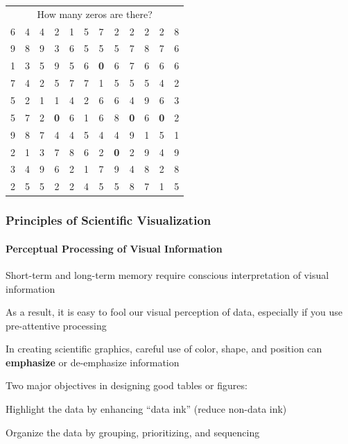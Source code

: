 \documentclass[10pt]{beamer}
\begin{document}
\begin{frame}
{\scriptsize
\begin{center}
\begin{tabular}{cccccccccccc}
\multicolumn{12}{c}{How many zeros are there?}\\
6     & 4    & 4    & 2    & 1    & 5    & 7    & 2    & 2    & 2    & 2    & 8    \\
9     & 8    & 9    & 3    & 6    & 5    & 5    & 5    & 7    & 8    & 7    & 6    \\
1     & 3    & 5    & 9    & 5    & 6    & {\bf \small \color{red}0}    & 6    & 7    & 6    & 6    & 6    \\
7     & 4    & 2    & 5    & 7    & 7    & 1    & 5    & 5    & 5    & 4    & 2   \\
5     & 2    & 1    & 1    & 4    & 2    & 6    & 6    & 4    & 9    & 6    & 3    \\
5     & 7    & 2    & {\bf \small \color{red}0}    & 6    & 1    & 6    & 8    & {\bf
  \small \color{red}0}    & 6    & {\bf \small \color{red}0}    & 2    \\
9     & 8    & 7    & 4    & 4    & 5    & 4    & 4    & 9    & 1    & 5    & 1    \\
2     & 1    & 3    & 7    & 8    & 6    & 2    & {\bf \small \color{red}0}    & 2    & 9    & 4    & 9    \\
3     & 4    & 9    & 6    & 2    & 1    & 7    & 9    & 4    & 8    & 2    & 8    \\
2     & 5    & 5    & 2    & 2    & 4    & 5    & 5    & 8    & 7    & 1    & 5    \\
\end{tabular}
\end{center}
}

\end{frame}


\begin{frame}
\frametitle{Principles of Scientific Visualization}
\framesubtitle{Perceptual Processing of Visual Information}

\bi 
\item {\color{blue} Short-term} and {\color{blue} long-term
  memory} require conscious interpretation of visual information

\item As a result, it is easy to fool our visual perception of data,
  especially if you use pre-attentive processing

\item In creating scientific graphics, careful use
  of color, shape, and position can {\large \bf \color{red}
  emphasize} or {\tiny \color{yellow} de-emphasize} information

\item Two major objectives in designing good tables or figures:

\bi
\item Highlight the data by enhancing ``data ink'' (reduce non-data ink)
\item Organize the data by grouping, prioritizing, and sequencing
\ei
\ei

\end{frame}
\end{document}
